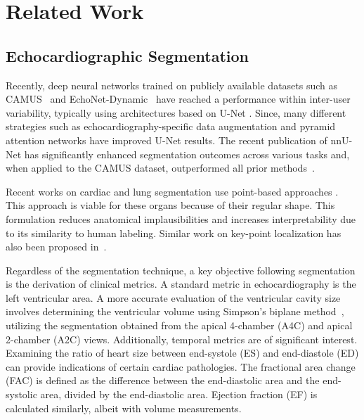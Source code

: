 \section{Related Work}
\label{sec:related_work}

\subsection{Echocardiographic Segmentation}

Recently, deep neural networks trained on publicly available datasets such as CAMUS~\cite{Leclerc19} and EchoNet-Dynamic~\cite{Ouyang2020_echonet} have reached a performance within inter-user variability, typically using architectures based on U-Net \cite{unet}. Since, many different strategies such as echocardiography-specific data augmentation \cite{GUDU} and pyramid attention networks \cite{pyramid_att_seg} have improved U-Net results. 
The recent publication of nnU-Net has significantly enhanced segmentation outcomes across various tasks \cite{isensee2021nnu} and, when applied to the CAMUS dataset, outperformed all prior methods~\cite{camus_nnUnet}.%


Recent works on cardiac and lung segmentation use point-based approaches \cite{lv3ch-dsnt,Gaggion_2022}. This approach is viable for these organs because of their regular shape. This formulation reduces anatomical implausibilities and increases interpretability due to its similarity to human labeling. Similar work on key-point localization has also been proposed in~\cite{thaler_heatmaps,Schobs_heatmaps}. 


Regardless of the segmentation technique, a key objective following segmentation is the derivation of clinical metrics. A standard metric in echocardiography is the left ventricular area. A more accurate evaluation of the ventricular cavity size involves determining the ventricular volume using Simpson's biplane method~\cite{2020LeftVE}, utilizing the segmentation obtained from the apical 4-chamber (A4C) and apical 2-chamber (A2C) views. Additionally, temporal metrics are of significant interest. Examining the ratio of heart size between end-systole (ES) and end-diastole (ED) can provide indications of certain cardiac pathologies. The fractional area change (FAC) is defined as the difference between the end-diastolic  area and the end-systolic  area, divided by the end-diastolic area. Ejection fraction (EF) is calculated similarly, albeit with volume measurements.

